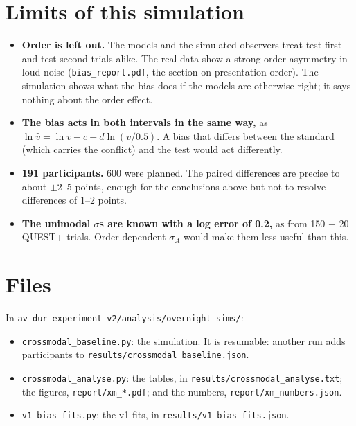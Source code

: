 \documentclass[11pt,a4paper]{article}
\begin{document}
\section{Limits of this simulation}
\begin{itemize}
\item \textbf{Order is left out.} The models and the simulated observers treat test-first and test-second trials alike. The real data show a strong order asymmetry in loud noise (\texttt{bias\_report.pdf}, the section on presentation order). The simulation shows what the bias does if the models are otherwise right; it says nothing about the order effect.
\item \textbf{The bias acts in both intervals in the same way,} as $\ln \hat v = \ln v - c - d \ln(v/0.5)$. A bias that differs between the standard (which carries the conflict) and the test would act differently.
\item \textbf{191 participants.} 600 were planned. The paired differences are precise to about $\pm$2--5 points, enough for the conclusions above but not to resolve differences of 1--2 points.
\item \textbf{The unimodal $\sigma$s are known with a log error of 0.2,} as from 150 + 20 QUEST+ trials. Order-dependent $\sigma_A$ would make them less useful than this.
\end{itemize}

\section*{Files}
\sloppy
In \texttt{av\_dur\_experiment\_v2/analysis/overnight\_sims/}:
\begin{itemize}
\item \texttt{crossmodal\_baseline.py}: the simulation. It is resumable: another run adds participants to \texttt{results/crossmodal\_baseline.json}.
\item \texttt{crossmodal\_analyse.py}: the tables, in \texttt{results/crossmodal\_analyse.txt}; the figures, \texttt{report/xm\_*.pdf}; and the numbers, \texttt{report/xm\_numbers.json}.
\item \texttt{v1\_bias\_fits.py}: the v1 fits, in \texttt{results/v1\_bias\_fits.json}.
\end{itemize}
\end{document}
